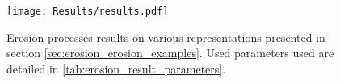 \clearpage
\begin{figure}
	\centering
    \texttt{[image: Results/results.pdf]}
	\caption{Erosion processes results on various representations presented in section \cref{sec:erosion_erosion_examples}. Used parameters used are detailed in  \cref{tab:erosion_result_parameters}.}
	\label{tab:erosion_result_figures}
\end{figure}
